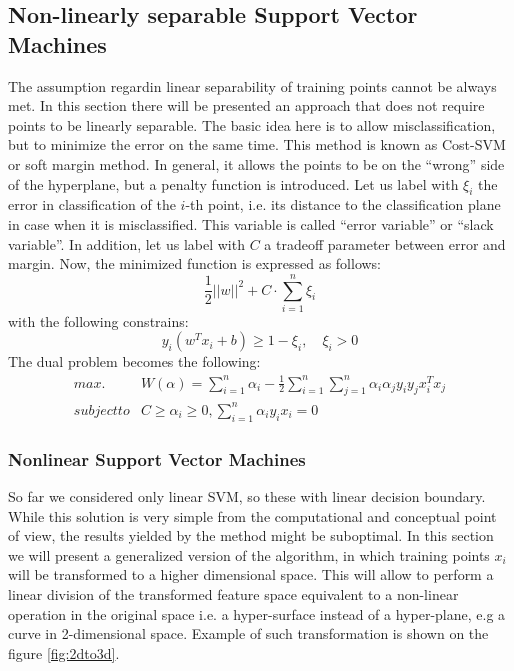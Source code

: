 \subsection{Non-linearly separable Support Vector Machines}
The assumption regardin linear separability of training points cannot be always met. In this section there will be presented an approach that does not require points to be linearly separable. The basic idea here is to allow misclassification, but to minimize the error on the same time. This method is known as Cost-SVM or soft margin method. In general, it allows the points to be on the ``wrong'' side of the hyperplane, but a penalty function is introduced.
Let us label with $\xi_i$ the error in classification of the $i$-th point, i.e. its distance to the classification plane in case when it is misclassified. This variable is called ``error variable'' or ``slack variable''. In addition, let us label with $C$ a tradeoff parameter between error and margin. Now, the minimized function is expressed as follows:
\begin{equation}
\frac{1}{2}||w||^2 + C \cdot \sum_{i=1}^{n}\xi_i
\end{equation}
with the following constrains:
\begin{equation}
y_i \left(w^Tx_i+b\right) \ge 1-\xi_i, \quad \xi_i>0
\end{equation}
The dual problem becomes the following:
\begin{align*}
max. & W(\alpha) = \sum_{i=1}^{n}\alpha_i-\frac{1}{2}\sum_{i=1}^{n}\sum_{j=1}^{n}\alpha_i\alpha_jy_iy_jx^T_ix_j \\
subject to & C \ge \alpha_i \ge 0, \sum_{i=1}^{n}\alpha_iy_ix_i=0
\end{align*}

\subsubsection{Nonlinear Support Vector Machines}
So far we considered only linear SVM, so these with linear decision boundary. While this solution is very simple from the computational and conceptual point of view, the results yielded by the method might be suboptimal. In this section we will present a generalized version of the algorithm, in which training points $x_i$ will be transformed to a higher dimensional space. This will allow to perform a linear division of the transformed feature space equivalent to a non-linear operation in the original space i.e. a hyper-surface instead of a hyper-plane, e.g a curve in 2-dimensional space. Example of such transformation is shown on the figure \ref{fig:2dto3d}.

